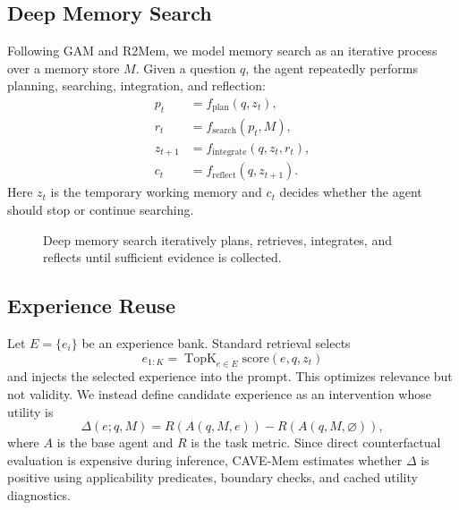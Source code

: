\documentclass[conference]{IEEEtran}
\newcommand{\method}{CAVE-Mem}
\newcommand{\score}{\mathrm{score}}
\begin{document}
\subsection{Deep Memory Search}
Following GAM and R2Mem, we model memory search as an iterative process over a
memory store $M$. Given a question $q$, the agent repeatedly performs planning,
searching, integration, and reflection:
\begin{align}
    p_t &= f_{\mathrm{plan}}(q, z_t),\\
    r_t &= f_{\mathrm{search}}(p_t, M),\\
    z_{t+1} &= f_{\mathrm{integrate}}(q, z_t, r_t),\\
    c_t &= f_{\mathrm{reflect}}(q, z_{t+1}).
\end{align}
Here $z_t$ is the temporary working memory and $c_t$ decides whether the agent
should stop or continue searching.

\begin{figure}[t]
\centering
{}
\caption{Deep memory search iteratively plans, retrieves, integrates, and
reflects until sufficient evidence is collected.}
\label{fig:deepsearch}
\end{figure}

\subsection{Experience Reuse}
Let $E=\{e_i\}$ be an experience bank. Standard retrieval selects
\begin{equation}
e_{1:K} = \operatorname{TopK}_{e\in E} \score(e, q, z_t)
\end{equation}
and injects the selected experience into the prompt. This optimizes relevance
but not validity. We instead define candidate experience as an intervention
whose utility is
\begin{equation}
\Delta(e;q,M)=R(A(q,M,e))-R(A(q,M,\varnothing)),
\end{equation}
where $A$ is the base agent and $R$ is the task metric. Since direct
counterfactual evaluation is expensive during inference, \method{} estimates
whether $\Delta$ is positive using applicability predicates, boundary checks,
and cached utility diagnostics.
\end{document}
